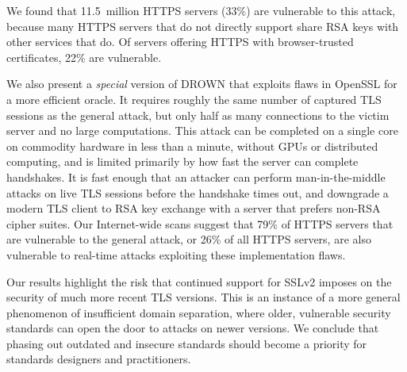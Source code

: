 We found that 11.5~million HTTPS servers (33\%) are vulnerable to this attack, 
because many HTTPS servers that do not directly support \ssltwo share
RSA keys with other services that do.   Of servers
offering HTTPS with browser-trusted certificates, 22\% are vulnerable.

We also present a \emph{special} version of DROWN that exploits flaws in OpenSSL for a more efficient oracle.
It requires roughly the same number of captured TLS sessions as the general attack, but only half as many connections to the victim server and no large computations.  
This attack can be completed on a single core on
commodity hardware in less than a minute, \ifext without GPUs or distributed computing, \fi
and is limited primarily by how fast the server can complete
handshakes.  It is fast enough that an attacker can perform man-in-the-middle attacks on live TLS
sessions before the handshake times out, and {downgrade} a modern TLS client to RSA key exchange with a server that prefers non-RSA cipher suites.
Our Internet-wide scans suggest that 79\% of HTTPS servers that are vulnerable to the general attack, or 26\% of all HTTPS servers,
are also vulnerable to real-time attacks exploiting these implementation flaws.

Our results highlight the risk that continued support for SSLv2 imposes on the security of much more recent TLS versions.
This is an instance of a more general phenomenon of insufficient domain separation, where older, vulnerable security standards can open the door to attacks on newer versions.
We conclude that phasing out outdated and insecure standards should become a priority for standards designers and practitioners. 

